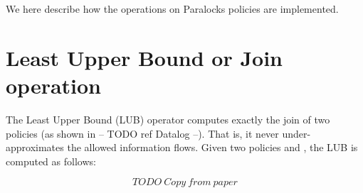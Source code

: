 We here describe how the operations on Paralocks policies are implemented.

\section{Least Upper Bound or Join operation}

The Least Upper Bound (LUB) operator computes exactly the join of two policies 
(as shown in -- TODO ref Datalog --). That is, it never under-approximates the
allowed information flows. Given two policies  and , the LUB 
is computed as follows:

\[
  \mathit{TODO\ Copy\ from\ paper}
\]
